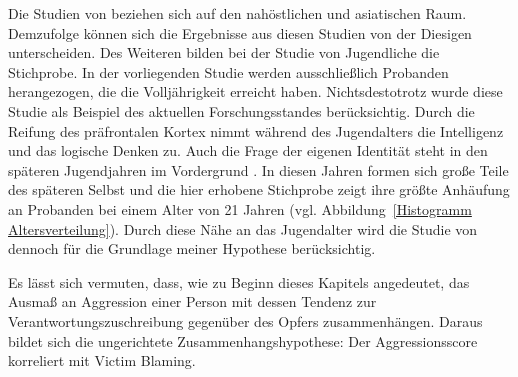 Die Studien von \textcite{H1_malasia_2012, H1_moderation_2020} beziehen sich auf den nahöstlichen und asiatischen Raum. Demzufolge können sich die Ergebnisse aus diesen Studien von der Diesigen unterscheiden. Des Weiteren bilden bei der Studie von \textcite{H1_malasia_2012} Jugendliche die Stichprobe. In der vorliegenden Studie werden ausschließlich Probanden herangezogen, die die Volljährigkeit erreicht haben. Nichtsdestotrotz wurde diese Studie als Beispiel des aktuellen Forschungsstandes berücksichtig. Durch die Reifung des präfrontalen Kortex nimmt während des Jugendalters die Intelligenz und das logische Denken zu. Auch die Frage der eigenen Identität steht in den späteren Jugendjahren im Vordergrund \parencite{H1_Entwicklung}. In diesen Jahren formen sich große Teile des späteren Selbst und die hier erhobene Stichprobe zeigt ihre größte Anhäufung an Probanden bei einem Alter von 21 Jahren (vgl. Abbildung~\ref{Histogramm Altersverteilung}). Durch diese Nähe an das Jugendalter wird die Studie von \textcite{H1_malasia_2012} dennoch für die Grundlage meiner Hypothese berücksichtig.

Es lässt sich vermuten, dass, wie zu Beginn dieses Kapitels angedeutet, das Ausmaß an Aggression einer Person mit dessen Tendenz zur Verantwortungszuschreibung gegenüber des Opfers zusammenhängen. Daraus bildet sich die ungerichtete Zusammenhangshypothese: Der Aggressionsscore korreliert mit Victim Blaming.